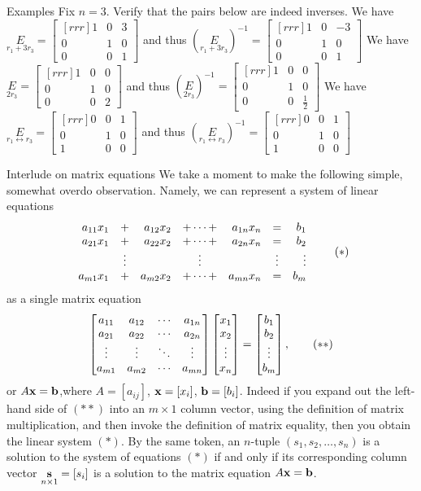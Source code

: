 \begin{frame}{Examples}
Fix $n=3$. Verify that the pairs below are indeed inverses. 
\bspace
We have $\underset{r_1+3r_3}{E}=\begin{bmatrix}[rrr] 1&0&3\\0&1&0\\ 0&0&1 \end{bmatrix}$ and thus 
$\left(\underset{r_1+3r_3}{E}\right)^{-1}=\begin{bmatrix}[rrr] 1&0&-3\\0&1&0\\ 0&0&1 \end{bmatrix}$
\bspace
We have $\underset{2r_3}{E}=\begin{bmatrix}[rrr] 1&0&0\\0&1&0\\ 0&0&2 \end{bmatrix}$ and thus 
$\left(\underset{2r_3}{E}\right)^{-1}=\begin{bmatrix}[rrr] 1&0&0\\0&1&0\\ 0&0&\frac{1}{2} \end{bmatrix}$ \bspace
We have $\underset{r_1\leftrightarrow r_3}{E}=\begin{bmatrix}[rrr] 0&0&1\\0&1&0\\ 1&0&0 \end{bmatrix}$ and thus 
$\left(\underset{r_1\leftrightarrow r_3}{E}\right)^{-1}=\begin{bmatrix}[rrr] 0&0&1\\0&1&0\\ 1&0&0 \end{bmatrix}$ 
\end{frame}
\begin{frame}{Interlude on matrix equations}
We take a moment to make the following simple, somewhat overdo observation. Namely, we can represent a \alert{system of linear equations} 
\[
\begin{array}{rcrcrcr} a_{11}x_{1}&+&a_{12}x_{2}&+\cdots+& a_{1n}x_{n}&=&b_1\\ a_{21}x_{1}&+&a_{22}x_{2}&+\cdots+&a_{2n}x_{n}&=&b_2\\ &\vdots& &\vdots & &\vdots & \vdots\\ a_{m1}x_{1}&+&a_{m2}x_{2}&+\cdots +&a_{mn}x_{n}&=&b_m \end{array}\tag{$*$}
\]
as a \alert{single matrix equation}
\[
\begin{bmatrix} a_{11} & a_{12} & \cdots & a_{1n} \\ a_{21} & a_{22} & \cdots & a_{2n} \\ \vdots & \vdots & \ddots & \vdots \\ a_{m1} & a_{m2} & \cdots & a_{mn} \end{bmatrix}\begin{bmatrix}
x_1\\x_2\\ \vdots \\ x_n
\end{bmatrix}
=\begin{bmatrix}
b_1\\ b_2 \\ \vdots \\ b_m
\end{bmatrix},\tag{$**$} 
\]
or $A{\mathbf x}={\mathbf b}$,where $A=[a_{ij}]$, ${\mathbf x}=[x_i]$, ${\mathbf b}=[b_i]$.
\bpause 
Indeed if you expand out the left-hand side of $(**)$ into an $m\times 1$ column vector, using the definition of matrix multiplication,  and then invoke the definition of matrix equality, then you obtain the linear system $(*)$. 
\bpause 
By the same token, an $n$-tuple $(s_1,s_2,\dots, s_n)$ is a solution to the \alert{system of equations} $(*)$ if and only if its corresponding column vector $\underset{n\times 1}{{\mathbf s}}=[s_i]$ is a solution to the \alert{matrix equation} $A{\mathbf x}={\mathbf b}$.  
\end{frame}

